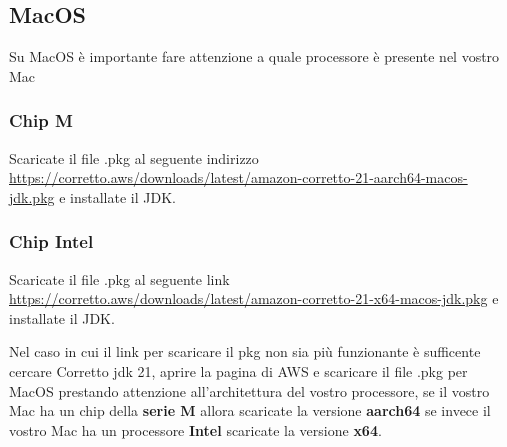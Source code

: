     \subsection{MacOS}
    Su MacOS è importante fare attenzione a quale processore è presente nel vostro Mac
    \subsubsection{Chip M}
        Scaricate il file .pkg al seguente indirizzo \url{https://corretto.aws/downloads/latest/amazon-corretto-21-aarch64-macos-jdk.pkg} e installate il JDK.
    \subsubsection{Chip Intel}
        Scaricate il file .pkg al seguente link \url{https://corretto.aws/downloads/latest/amazon-corretto-21-x64-macos-jdk.pkg} e installate il JDK.
    
    \hfill \break
    Nel caso in cui il link per scaricare il pkg non sia più funzionante è sufficente cercare Corretto jdk 21, aprire la pagina di AWS e scaricare il file .pkg per MacOS prestando 
    attenzione all'architettura del vostro processore, se il vostro Mac ha un chip della \textbf{serie M} allora scaricate la versione \textbf{aarch64} se invece il vostro Mac
    ha un processore \textbf{Intel} scaricate la versione \textbf{x64}.